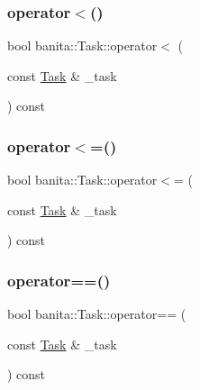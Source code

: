 \mbox{\label{classbanita_1_1_task_ac088e4c87f080fb26dfdfc1ef13f78d6}} 
\subsubsection{\texorpdfstring{operator$<$()}{operator<()}}
{\footnotesize\ttfamily bool banita\+::\+Task\+::operator$<$ (\begin{DoxyParamCaption}\item[{const \mbox{\hyperlink{classbanita_1_1_task}{Task}} \&}]{\+\_\+task }\end{DoxyParamCaption}) const\hspace{0.3cm}{\ttfamily [inline]}}

\mbox{\label{classbanita_1_1_task_a5fe48a7f1fc054c0f2376cf06853253c}} 
\subsubsection{\texorpdfstring{operator$<$=()}{operator<=()}}
{\footnotesize\ttfamily bool banita\+::\+Task\+::operator$<$= (\begin{DoxyParamCaption}\item[{const \mbox{\hyperlink{classbanita_1_1_task}{Task}} \&}]{\+\_\+task }\end{DoxyParamCaption}) const\hspace{0.3cm}{\ttfamily [inline]}}

\mbox{\label{classbanita_1_1_task_af893f3c0cfefa81d9311c2b3532c597c}} 
\subsubsection{\texorpdfstring{operator==()}{operator==()}}
{\footnotesize\ttfamily bool banita\+::\+Task\+::operator== (\begin{DoxyParamCaption}\item[{const \mbox{\hyperlink{classbanita_1_1_task}{Task}} \&}]{\+\_\+task }\end{DoxyParamCaption}) const\hspace{0.3cm}{\ttfamily [inline]}}

